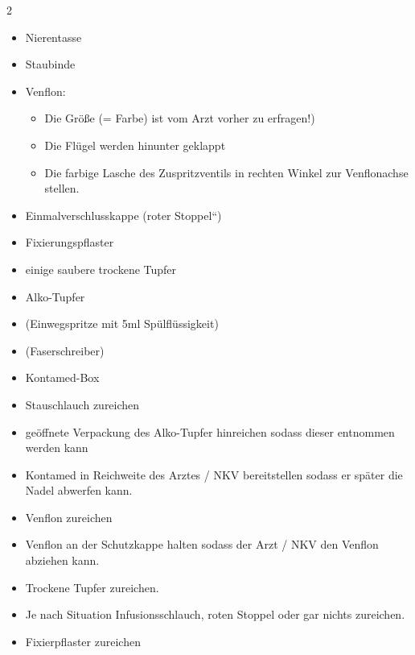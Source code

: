 
\begin{multicols}{2}
\begin{itemize}
    \item Nierentasse
    \item Staubinde
    \item Venflon:
    \begin{itemize}
        \item Die Gr\"o{\ss}e (= Farbe) ist vom Arzt vorher zu erfragen!)
        \item Die Fl\"ugel werden hinunter geklappt
        \item Die farbige Lasche des Zuspritzventils in rechten Winkel zur
        Venflonachse stellen.
    \end{itemize}
    \item Einmalverschlusskappe ({\quotedblbase}roter
    Stoppel{\textquotedblleft})
    \item Fixierungspflaster
    \item einige saubere trockene Tupfer
    \item Alko-Tupfer
    \item (Einwegspritze mit 5ml Sp\"ulfl\"ussigkeit)
    \item (Faserschreiber)
    \item Kontamed-Box
\end{itemize}
\end{multicols}


\begin{itemize}
\item Stauschlauch zureichen

\item ge\"offnete Verpackung des Alko-Tupfer hinreichen sodass dieser
entnommen werden kann

\item Kontamed in Reichweite des  Arztes / NKV bereitstellen sodass er
sp\"ater die Nadel abwerfen kann.

\item Venflon zureichen

\end{itemize}
\begin{itemize}
\item Venflon an der Schutzkappe halten sodass der Arzt / NKV den
Venflon abziehen kann.

\end{itemize}
\begin{itemize}
\item Trockene Tupfer zureichen.

\item Je nach Situation Infusionsschlauch, roten Stoppel oder gar nichts
zureichen.  

\item Fixierpflaster zureichen

\end{itemize}
